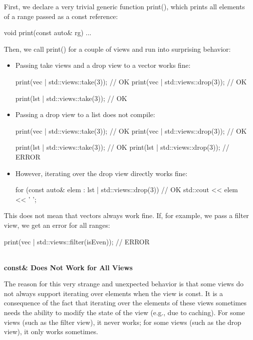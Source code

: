First, we declare a very trivial generic function print(), which prints all elements of a range passed as a const reference:

\begin{cpp}
void print(const auto& rg)
{
	...
}
\end{cpp}

Then, we call print() for a couple of views and run into surprising behavior:


\begin{itemize}
\item
Passing take views and a drop view to a vector works fine:

\begin{cpp}
print(vec | std::views::take(3)); // OK
print(vec | std::views::drop(3)); // OK

print(lst | std::views::take(3)); // OK
\end{cpp}

\item
Passing a drop view to a list does not compile:

\begin{cpp}
print(vec | std::views::take(3)); // OK
print(vec | std::views::drop(3)); // OK

print(lst | std::views::take(3)); // OK
print(lst | std::views::drop(3)); // ERROR
\end{cpp}

\item
However, iterating over the drop view directly works fine:

\begin{cpp}
for (const auto& elem : lst | std::views::drop(3)) { // OK
	std::cout << elem << ' ';
}
\end{cpp}
\end{itemize}

This does not mean that vectors always work fine. If, for example, we pass a filter view, we get an error for all ranges:

\begin{cpp}
print(vec | std::views::filter(isEven)); // ERROR
\end{cpp}


\noindent
\hspace*{\fill} \\ %
\textbf{const\& Does Not Work for All Views}

The reason for this very strange and unexpected behavior is that some views do not always support iterating over elements when the view is const. It is a consequence of the fact that iterating over the elements of these views sometimes needs the ability to modify the state of the view (e.g., due to caching). For some views (such as the filter view), it never works; for some views (such as the drop view), it only works sometimes.

